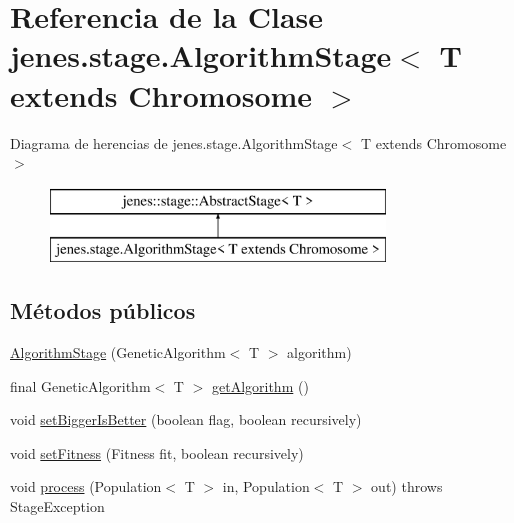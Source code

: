 \hypertarget{classjenes_1_1stage_1_1_algorithm_stage_3_01_t_01extends_01_chromosome_01_4}{\section{Referencia de la Clase jenes.\-stage.\-Algorithm\-Stage$<$ T extends Chromosome $>$}
\label{classjenes_1_1stage_1_1_algorithm_stage_3_01_t_01extends_01_chromosome_01_4}
}
Diagrama de herencias de jenes.\-stage.\-Algorithm\-Stage$<$ T extends Chromosome $>$\begin{figure}[H]
\begin{center}
\leavevmode
\includegraphics[height=2.000000cm]{classjenes_1_1stage_1_1_algorithm_stage_3_01_t_01extends_01_chromosome_01_4}
\end{center}
\end{figure}
\subsection*{Métodos públicos}
\begin{DoxyCompactItemize}
\item 
\hyperlink{classjenes_1_1stage_1_1_algorithm_stage_3_01_t_01extends_01_chromosome_01_4_a802871d36189757fc869c5a542dc1b9c}{Algorithm\-Stage} (Genetic\-Algorithm$<$ T $>$ algorithm)
\item 
final Genetic\-Algorithm$<$ T $>$ \hyperlink{classjenes_1_1stage_1_1_algorithm_stage_3_01_t_01extends_01_chromosome_01_4_a7c1be30eb9852c0f16031f3802d770aa}{get\-Algorithm} ()
\item 
void \hyperlink{classjenes_1_1stage_1_1_algorithm_stage_3_01_t_01extends_01_chromosome_01_4_a5d27c95b7872fc28cc7b78be601dd9d0}{set\-Bigger\-Is\-Better} (boolean flag, boolean recursively)
\item 
void \hyperlink{classjenes_1_1stage_1_1_algorithm_stage_3_01_t_01extends_01_chromosome_01_4_a43c9964c60c539aaea0193c9552b262b}{set\-Fitness} (Fitness fit, boolean recursively)
\item 
void \hyperlink{classjenes_1_1stage_1_1_algorithm_stage_3_01_t_01extends_01_chromosome_01_4_a43a7b7271f320f04c8be69bfdafb078e}{process} (Population$<$ T $>$ in, Population$<$ T $>$ out)  throws Stage\-Exception 
\end{DoxyCompactItemize}


